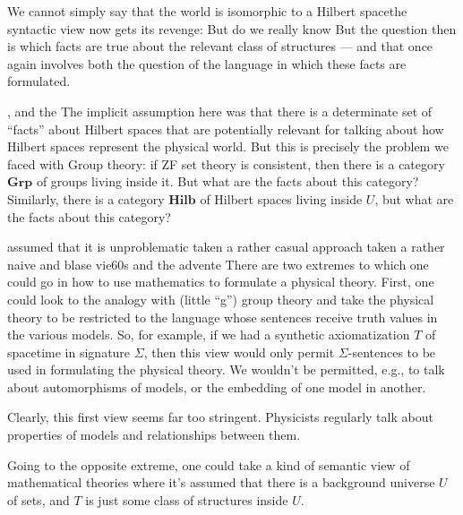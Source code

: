 \documentclass[12pt,fleqn]{article}
\begin{document}
We cannot simply say that the world is isomorphic to a Hilbert
spacethe syntactic view now gets its revenge: But do we really know
But the question then is which facts are true about the relevant class
of structures --- and that once again involves both the question of
the language in which these facts are formulated.

, and the The implicit assumption here was
that there is a determinate set of ``facts'' about Hilbert spaces that
are potentially relevant for talking about how Hilbert spaces
represent the physical world. But this is precisely the problem we
faced with Group theory: if ZF set theory is consistent, then there is
a category $\mathbf{Grp}$ of groups living inside it. But what are the
facts about this category?  Similarly, there is a category
$\mathbf{Hilb}$ of Hilbert spaces living inside $U$, but what are the
facts about this category?

assumed that it is unproblematic taken a rather casual approach taken
a rather naive and blase vie60s and the advente There are two extremes
to which one could go in how to use mathematics to formulate a
physical theory. First, one could look to the analogy with (little
``g'') group theory and take the physical theory to be restricted to
the language whose sentences receive truth values in the various
models. So, for example, if we had a synthetic axiomatization $T$ of
spacetime in signature $\Sigma$, then this view would only permit
$\Sigma$-sentences to be used in formulating the physical theory. We
wouldn't be permitted, e.g., to talk about automorphisms of models, or
the embedding of one model in another.

Clearly, this first view seems far too stringent. Physicists regularly
talk about properties of models and relationships between them.

Going to the opposite extreme, one could take a kind of semantic view
of mathematical theories where it's assumed that there is a background
universe $U$ of sets, and $T$ is just some class of structures inside
$U$.

\printbibliography 
\end{document}
